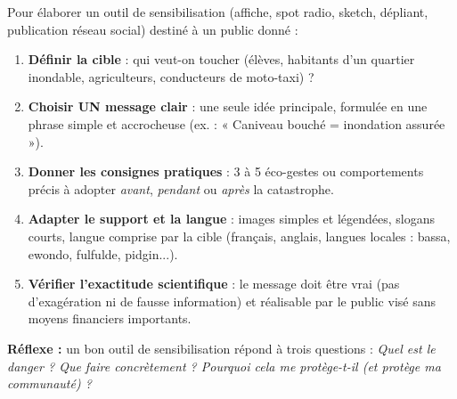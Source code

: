 \documentclass[11pt]{article}
\begin{document}
\begin{methode}
Pour élaborer un outil de sensibilisation (affiche, spot radio, sketch, dépliant, publication réseau social) destiné à un public donné :
\begin{enumerate}
\item \textbf{Définir la cible} : qui veut-on toucher (élèves, habitants d'un quartier inondable, agriculteurs, conducteurs de moto-taxi) ?
\item \textbf{Choisir UN message clair} : une seule idée principale, formulée en une phrase simple et accrocheuse (ex. : « Caniveau bouché = inondation assurée »).
\item \textbf{Donner les consignes pratiques} : 3 à 5 éco-gestes ou comportements précis à adopter \emph{avant}, \emph{pendant} ou \emph{après} la catastrophe.
\item \textbf{Adapter le support et la langue} : images simples et légendées, slogans courts, langue comprise par la cible (français, anglais, langues locales : bassa, ewondo, fulfulde, pidgin...).
\item \textbf{Vérifier l'exactitude scientifique} : le message doit être vrai (pas d'exagération ni de fausse information) et réalisable par le public visé sans moyens financiers importants.
\end{enumerate}
\textbf{Réflexe :} un bon outil de sensibilisation répond à trois questions : \emph{Quel est le danger ? Que faire concrètement ? Pourquoi cela me protège-t-il (et protège ma communauté) ?}
\end{methode}
\end{document}
